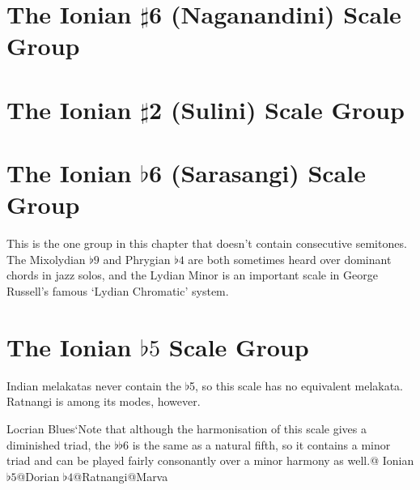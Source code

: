 \documentclass[english]{./gbook}
\begin{document}
\begin{large}
\section{The Ionian $\sharp$6 (Naganandini) Scale Group}

\section{The Ionian $\sharp$2 (Sulini) Scale Group}

\section{The Ionian $\flat$6 (Sarasangi) Scale Group}
This is the one group in this chapter that doesn't contain consecutive semitones. The Mixolydian $\flat 9$ and Phrygian $\flat 4$ are both sometimes heard over dominant chords in jazz solos, and the Lydian Minor is an important scale in George Russell's famous `Lydian Chromatic' system.

\section{The Ionian $\flat 5$ Scale Group}

Indian melakatas never contain the $\flat$5, so this scale has no equivalent melakata. Ratnangi is among its modes, however.

Locrian Blues`Note that although the harmonisation of this scale gives a diminished triad, the $\flat\flat$6 is the same as a natural fifth, so it contains a minor triad and can be played fairly consonantly over a minor harmony as well.@
Ionian $\flat 5$@Dorian $\flat 4$@Ratnangi@Marva%







\end{large}
\end{document}
